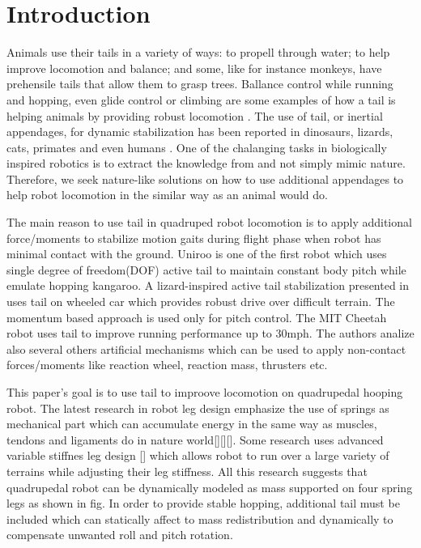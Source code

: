 \section{Introduction}\label{sec:introduction}

Animals use their tails in a variety of ways: to propell through water; to help improve locomotion and balance; and some, like for instance monkeys, have prehensile tails that allow them to grasp trees. Ballance control while running and hopping, even glide control or climbing are some examples of how a tail is helping animals by providing robust locomotion \cite{Thomas:Nature2012}. The use of tail, or inertial appendages, for dynamic stabilization has been reported in dinosaurs, lizards, cats, primates and even humans \cite{ostrom1969osteology,PijnappelsSringer,Walker199841,JusufiIOP2010}. One of the chalanging tasks in biologically inspired robotics is to extract the knowledge from and not simply mimic nature. Therefore, we seek nature-like solutions on how to use additional appendages to help robot locomotion in the similar way as an animal would do.  

The main reason to use tail in quadruped robot locomotion is to apply additional force/moments to stabilize motion gaits during flight phase when robot has minimal contact with the ground. Uniroo \cite{zeglin1991uniroo} is one of the first robot which uses single degree of freedom(DOF) active tail to maintain constant body pitch while emulate hopping kangaroo. A lizard-inspired active tail stabilization presented in \cite{conf/iros/Chang-SiuLTF11} uses tail on wheeled car which provides robust drive over difficult terrain. The momentum based approach is used only for pitch control. The MIT Cheetah robot \cite{DBLP:conf/iros/2012} uses tail to improve running performance up to 30mph. The authors analize also several others artificial mechanisms which can be used to apply non-contact forces/moments like reaction wheel, reaction mass, thrusters etc. 

This paper's goal is to use tail to improove locomotion on quadrupedal hooping robot. The latest research in robot leg design emphasize the use of springs as mechanical part which can accumulate energy in the same way as muscles, tendons and ligaments do in nature world[][][]. Some research uses advanced variable stiffnes leg design [] which allows robot to run over a large variety of terrains while adjusting their leg stiffness. All this research suggests that quadrupedal robot can be dynamically modeled as mass supported on four spring legs as shown in fig. In order to provide stable hopping, additional tail must be included which can statically affect to mass redistribution and dynamically to compensate unwanted roll and pitch rotation. 


